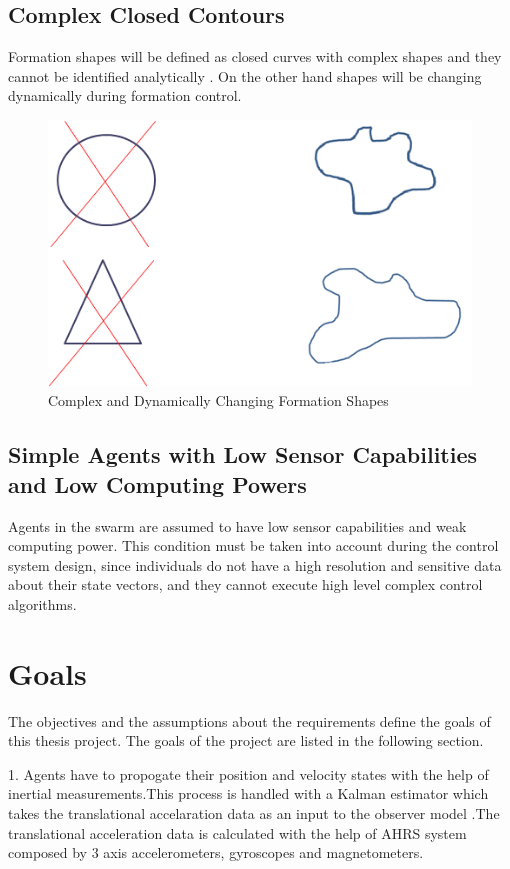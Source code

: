 \subsection{Complex Closed Contours}
Formation shapes will be defined as closed curves with complex shapes and they cannot be identified analytically . On the other hand shapes will be changing dynamically during formation control.

\begin{figure}[H]
\caption{Complex and Dynamically Changing Formation Shapes}
\centering
\includegraphics[scale = 1]{complex}
\end{figure}

\subsection{Simple Agents with Low Sensor Capabilities and Low Computing Powers}
Agents in the swarm are assumed to have low sensor capabilities and weak computing power. This condition must be taken into account during the control system design, since individuals do not have a high resolution and sensitive data about their state vectors, and they cannot execute high level complex control algorithms.

\section{Goals}
The objectives and the assumptions about the requirements define the goals of this thesis project. The goals of the project are listed in the following section.

1. Agents have to propogate their position and velocity states with the help of inertial measurements.This process is handled with a Kalman estimator which takes the translational accelaration data as an input to the observer model .The translational acceleration data is calculated with the help of AHRS system composed by 3 axis accelerometers, gyroscopes and magnetometers. 

